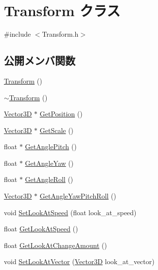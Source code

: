 \hypertarget{class_transform}{}\section{Transform クラス}
\label{class_transform}


{\ttfamily \#include $<$Transform.\+h$>$}

\subsection*{公開メンバ関数}
\begin{DoxyCompactItemize}
\item 
\mbox{\hyperlink{class_transform_aa08ca4266efabc768973cdeea51945ab}{Transform}} ()
\item 
\mbox{\hyperlink{class_transform_aa72e286c069850db80927b0e6554cd3e}{$\sim$\+Transform}} ()
\item 
\mbox{\hyperlink{class_vector3_d}{Vector3D}} $\ast$ \mbox{\hyperlink{class_transform_addff6461a77b9f5c5249e46deb5c2c19}{Get\+Position}} ()
\item 
\mbox{\hyperlink{class_vector3_d}{Vector3D}} $\ast$ \mbox{\hyperlink{class_transform_accedf33a4ddbdcf2d4fc4274f85bf818}{Get\+Scale}} ()
\item 
float $\ast$ \mbox{\hyperlink{class_transform_a8c4966ea0a5d6cafa79c430e31bf0dff}{Get\+Angle\+Pitch}} ()
\item 
float $\ast$ \mbox{\hyperlink{class_transform_a8be9cd3526cc18d64e47b55f4c527dd8}{Get\+Angle\+Yaw}} ()
\item 
float $\ast$ \mbox{\hyperlink{class_transform_a124d6afb5dd0a86952c99f1cec72e394}{Get\+Angle\+Roll}} ()
\item 
\mbox{\hyperlink{class_vector3_d}{Vector3D}} $\ast$ \mbox{\hyperlink{class_transform_a1bd5cddc216e7fafe12e5b605cb780ea}{Get\+Angle\+Yaw\+Pitch\+Roll}} ()
\item 
void \mbox{\hyperlink{class_transform_ab6f7342cb4eca555c02a85c999d499dc}{Set\+Look\+At\+Speed}} (float look\+\_\+at\+\_\+speed)
\item 
float \mbox{\hyperlink{class_transform_a79fdb2cb4eb1e4abf48e0f9fd74707ba}{Get\+Look\+At\+Speed}} ()
\item 
float \mbox{\hyperlink{class_transform_a14b7b06632d6a47e99dc67aecbd7acc7}{Get\+Look\+At\+Change\+Amount}} ()
\item 
void \mbox{\hyperlink{class_transform_a39b78acbdbf3ee98cad0c4e640988745}{Set\+Look\+At\+Vector}} (\mbox{\hyperlink{class_vector3_d}{Vector3D}} look\+\_\+at\+\_\+vector)

\end{DoxyCompactItemize}
